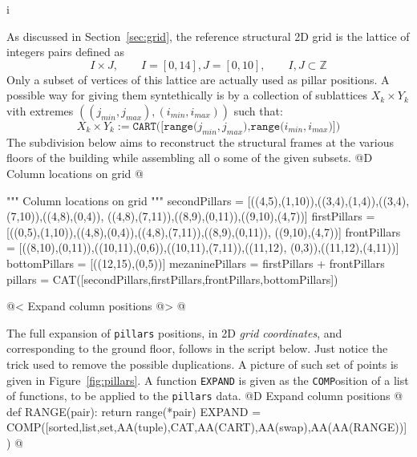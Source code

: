 i\documentclass[11pt,oneside]{article}    %
\def\Z{\mathbb{Z}}
\begin{document}
As discussed in Section~\ref{sec:grid}, the reference structural 2D grid is the lattice of integers pairs defined as 
\[
I \times J, \qquad I = [0,14], J = [0,10], \qquad I,J \subset \Z
\]
Only a subset of vertices of this lattice are actually used as pillar positions. A possible way for giving them syntethically is by a collection of sublattices $X_k\times Y_k$ vith extremes $((j_{min},j_{max}),(i_{min},i_{max}))$ such that:
\[
X_k\times Y_k := \texttt{CART([range($j_{min},j_{max}$),range($i_{min},i_{max}$)])}
\]
The subdivision below aims to reconstruct the structural frames at the various floors of the building while assembling all o some of the given subsets.
@D Column locations on grid @{
""" Column locations on grid """
secondPillars = [((4,5),(1,10)),((3,4),(1,4)),((3,4),(7,10)),((4,8),(0,4)),
    ((4,8),(7,11)),((8,9),(0,11)),((9,10),(4,7))]
firstPillars = [((0,5),(1,10)),((4,8),(0,4)),((4,8),(7,11)),((8,9),(0,11)),
    ((9,10),(4,7))]
frontPillars = [((8,10),(0,11)),((10,11),(0,6)),((10,11),(7,11)),((11,12),
    (0,3)),((11,12),(4,11))]
bottomPillars = [((12,15),(0,5))]
mezaninePillars = firstPillars + frontPillars
pillars = CAT([secondPillars,firstPillars,frontPillars,bottomPillars])

@< Expand column positions @>
@}
The full expansion of \texttt{pillars} positions, in 2D \emph{grid coordinates}, and corresponding to the ground floor, follows in the script below. Just notice the trick used to remove the possible duplications. A picture of such set of points is given in Figure~\ref{fig:pillars}.
A function \texttt{EXPAND} is given as the \texttt{COMP}osition of a list of functions, to be applied to the \texttt{pillars} data.
@D Expand column positions  @{
def RANGE(pair): 
    return range(*pair)
EXPAND = COMP([sorted,list,set,AA(tuple),CAT,AA(CART),AA(swap),AA(AA(RANGE))])
@}
\end{document}
